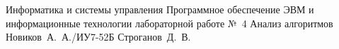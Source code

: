 \documentclass{bmstu}
\begin{document}
\makereporttitle
    {Информатика и системы управления}
    {Программное обеспечение ЭВМ и информационные технологии}
    {лабораторной работе №~4}
    {Анализ алгоритмов}
    {}
    {}
    {Новиков~А.~А./ИУ7-52Б}
    {Строганов~Д.~В.}

\renewcommand{\contentsname}{СОДЕРЖАНИЕ} 
\tableofcontents
\setcounter{page}{2}



\makebibliography
\end{document}
